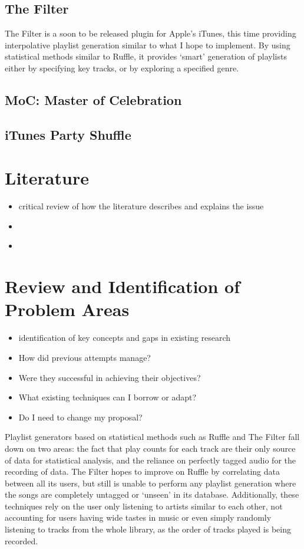 \subsection{The Filter}
The Filter is a soon to be released plugin for Apple's iTunes, this time providing interpolative playlist generation similar to what I hope to implement. By using statistical methods similar to Ruffle, it provides `smart' generation of playlists either by specifying key tracks, or by exploring a specified genre.
\subsection{MoC: Master of Celebration}
\subsection{iTunes Party Shuffle}
\section{Literature}
\begin{itemize}
	\item critical review of how the literature describes and explains the issue
\end{itemize}
\begin{itemize}
	\item \citet*{Aucouturier2002,Aucouturier2002a,Aucouturier2003}
	\item \citet*{Logan2002}
\end{itemize}
\section{Review and Identification of Problem Areas}
\begin{itemize}
	\item identification of key concepts and gaps in existing research
\end{itemize}
\begin{itemize}
	\item How did previous attempts manage?
	\item Were they successful in achieving their objectives?
	\item What existing techniques can I borrow or adapt?
	\item Do I need to change my proposal?
\end{itemize}
Playlist generators based on statistical methods such as Ruffle and The Filter fall down on two areas: the fact that play counts for each track are their only source of data for statistical analysis, and the reliance on perfectly tagged audio for the recording of data. The Filter hopes to improve on Ruffle by correlating data between all its users, but still is unable to perform any playlist generation where the songs are completely untagged or `unseen' in its database. Additionally, these techniques rely on the user only listening to artists similar to each other, not accounting for users having wide tastes in music or even simply randomly listening to tracks from the whole library, as the order of tracks played is being recorded.

